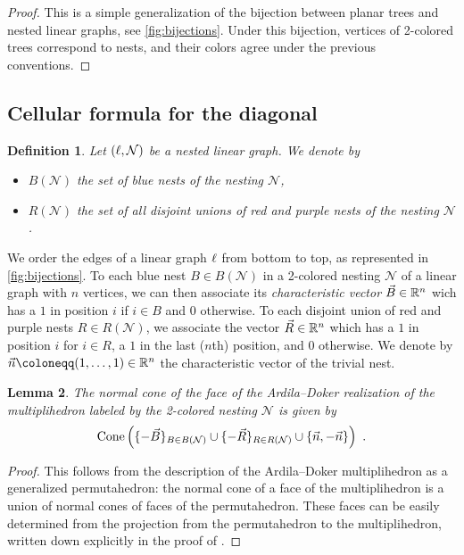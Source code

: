 \documentclass[twoside, 11pt]{amsart}
\newtheorem{definition}{Definition}[section]
\newtheorem{lemma}[definition]{Lemma}
\theoremstyle{remark}
\begin{document}
\begin{proof}
This is a simple generalization of the bijection between planar trees and nested linear graphs, see \cref{fig:bijections}. 
Under this bijection, vertices of 2-colored trees correspond to nests, and their colors agree under the previous conventions. 
\end{proof}



\subsection{Cellular formula for the diagonal} \label{ss:cellular-formula}

\begin{definition}
Let $(\ell,\mathcal{N})$ be a nested linear graph. We denote by 
\begin{itemize}[leftmargin=*]
  \item $B(\mathcal{N})$ the set of blue nests of the nesting $\mathcal{N}$,
  \item $R(\mathcal{N})$ the set of all disjoint \emph{unions} of red and purple nests of the nesting $\mathcal{N}$.
\end{itemize}
\end{definition}

We order the edges of a linear graph $\ell$ from bottom to top, as represented in \cref{fig:bijections}. 
To each blue nest $B \in B(\mathcal{N})$ in a 2-colored nesting $\mathcal{N}$ of a linear graph with $n$ vertices, we can then associate its \emph{characteristic vector} $\vec B\in \mathbb{R}^n$ wich has a $1$ in position $i$ if $i \in B$ and $0$ otherwise.
To each disjoint union of red and purple nests $R \in R(\mathcal{N})$, we associate the vector $\vec R \in \mathbb{R}^n$ which has a $1$ in position $i$ for $i \in R$, a $1$ in the last ($n$th) position, and $0$ otherwise. 
We denote by $\vec n \coloneqq (1,\ldots,1) \in \RR^n$ the characteristic vector of the trivial nest.

\begin{lemma} 
\label{lemma:normalcones}
The normal cone of the face of the Ardila--Doker realization of the multiplihedron labeled by the 2-colored nesting $\mathcal{N}$ is given by \[\operatorname{Cone}\left(\{-\vec B\}_{B \in B(\mathcal{N})} \cup \{-\vec R\}_{R \in R(\mathcal{N})} \cup \{\vec n, - \vec n\} \right) \ . \]
\end{lemma} 

\begin{proof} 
This follows from the description of the Ardila--Doker multiplihedron as a generalized permutahedron: 
the normal cone of a face of the multiplihedron is a union of normal cones of faces of the permutahedron. 
These faces can be easily determined from the projection from the permutahedron to the multiplihedron, written down explicitly in the proof of \cite[Theorem 3.3.6]{Doker11}.
\end{proof}
\end{document}
